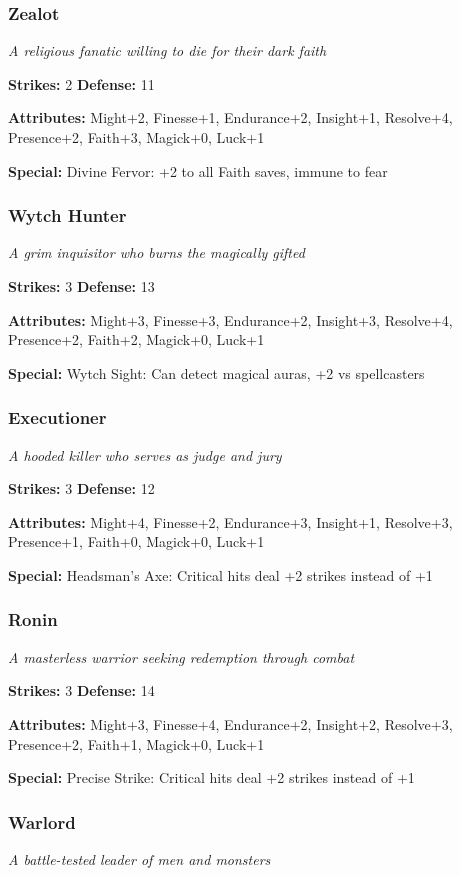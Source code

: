 \documentclass[10pt,twoside]{article}
\begin{document}
\subsubsection{Zealot}
\textit{A religious fanatic willing to die for their dark faith}

\textbf{Strikes:} 2 \quad \textbf{Defense:} 11

\textbf{Attributes:} Might+2, Finesse+1, Endurance+2, Insight+1, Resolve+4, Presence+2, Faith+3, Magick+0, Luck+1

\textbf{Special:} Divine Fervor: +2 to all Faith saves, immune to fear

\subsubsection{Wytch Hunter}
\textit{A grim inquisitor who burns the magically gifted}

\textbf{Strikes:} 3 \quad \textbf{Defense:} 13

\textbf{Attributes:} Might+3, Finesse+3, Endurance+2, Insight+3, Resolve+4, Presence+2, Faith+2, Magick+0, Luck+1

\textbf{Special:} Wytch Sight: Can detect magical auras, +2 vs spellcasters

\subsubsection{Executioner}
\textit{A hooded killer who serves as judge and jury}

\textbf{Strikes:} 3 \quad \textbf{Defense:} 12

\textbf{Attributes:} Might+4, Finesse+2, Endurance+3, Insight+1, Resolve+3, Presence+1, Faith+0, Magick+0, Luck+1

\textbf{Special:} Headsman's Axe: Critical hits deal +2 strikes instead of +1

\subsubsection{Ronin}
\textit{A masterless warrior seeking redemption through combat}

\textbf{Strikes:} 3 \quad \textbf{Defense:} 14

\textbf{Attributes:} Might+3, Finesse+4, Endurance+2, Insight+2, Resolve+3, Presence+2, Faith+1, Magick+0, Luck+1

\textbf{Special:} Precise Strike: Critical hits deal +2 strikes instead of +1

\subsubsection{Warlord}
\textit{A battle-tested leader of men and monsters}
\end{document}

